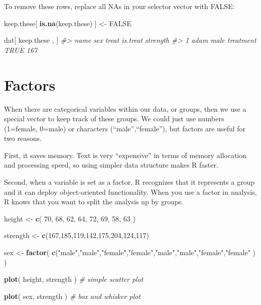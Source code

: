 \documentclass[]{book}
\newenvironment{Shaded}{\begin{snugshade}}{\end{snugshade}}
\newcommand{\CommentTok}[1]{\textcolor[rgb]{0.56,0.35,0.01}{\textit{#1}}}
\newcommand{\DecValTok}[1]{\textcolor[rgb]{0.00,0.00,0.81}{#1}}
\newcommand{\KeywordTok}[1]{\textcolor[rgb]{0.13,0.29,0.53}{\textbf{#1}}}
\newcommand{\NormalTok}[1]{#1}
\newcommand{\OtherTok}[1]{\textcolor[rgb]{0.56,0.35,0.01}{#1}}
\newcommand{\StringTok}[1]{\textcolor[rgb]{0.31,0.60,0.02}{#1}}
\theoremstyle{definition}
\theoremstyle{definition}
\theoremstyle{definition}
\theoremstyle{remark}
\begin{document}
To remove these rows, replace all NAs in your selector vector with
FALSE:

\begin{Shaded}
\begin{Highlighting}[]
\NormalTok{keep.these[ }\KeywordTok{is.na}\NormalTok{(keep.these) ] <-}\StringTok{ }\OtherTok{FALSE}

\NormalTok{dat[ keep.these , ]}
\CommentTok{#>   name  sex     treat is.treat strength}
\CommentTok{#> 1 adam male treatment     TRUE      167}
\end{Highlighting}
\end{Shaded}

\hypertarget{factors}{%
\section{Factors}\label{factors}}

When there are categorical variables within our data, or groups, then we
use a special vector to keep track of these groups. We could just use
numbers (1=female, 0=male) or characters (``male'',``female''), but
factors are useful for two reasons.

First, it saves memory. Text is very ``expensive'' in terms of memory
allocation and processing speed, so using simpler data structure makes R
faster.

Second, when a variable is set as a factor, R recognizes that it
represents a group and it can deploy object-oriented functionality. When
you use a factor in analysis, R knows that you want to split the
analysis up by groups.

\begin{Shaded}
\begin{Highlighting}[]

\NormalTok{height <-}\StringTok{ }\KeywordTok{c}\NormalTok{( }\DecValTok{70}\NormalTok{, }\DecValTok{68}\NormalTok{, }\DecValTok{62}\NormalTok{, }\DecValTok{64}\NormalTok{, }\DecValTok{72}\NormalTok{, }\DecValTok{69}\NormalTok{, }\DecValTok{58}\NormalTok{, }\DecValTok{63}\NormalTok{  )}

\NormalTok{strength <-}\StringTok{ }\KeywordTok{c}\NormalTok{(}\DecValTok{167}\NormalTok{,}\DecValTok{185}\NormalTok{,}\DecValTok{119}\NormalTok{,}\DecValTok{142}\NormalTok{,}\DecValTok{175}\NormalTok{,}\DecValTok{204}\NormalTok{,}\DecValTok{124}\NormalTok{,}\DecValTok{117}\NormalTok{)}

\NormalTok{sex <-}\StringTok{ }\KeywordTok{factor}\NormalTok{( }\KeywordTok{c}\NormalTok{(}\StringTok{"male"}\NormalTok{,}\StringTok{"male"}\NormalTok{,}\StringTok{"female"}\NormalTok{,}\StringTok{"female"}\NormalTok{,}\StringTok{"male"}\NormalTok{,}\StringTok{"male"}\NormalTok{,}\StringTok{"female"}\NormalTok{,}\StringTok{"female"}\NormalTok{ ) )}

\KeywordTok{plot}\NormalTok{( height, strength )   }\CommentTok{# simple scatter plot}

\KeywordTok{plot}\NormalTok{( sex, strength )      }\CommentTok{# box and whisker plot       }
\end{Highlighting}
\end{Shaded}
\end{document}
